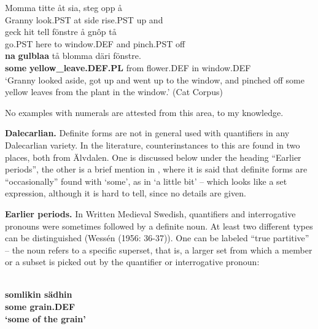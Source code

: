 \z

\ea
\gll Momma  titte  åt  sia,   steg  opp  å\\
Granny  look.PST  at  side  rise.PST  up  and\\
\gll geck  hit  tell  fönstre  å  gnôp  tå\\
go.PST  here  to  window.DEF  and  pinch.PST  off\\
\gll \textbf{na} \textbf{  gulblaa} tå  blomma  däri  fönstre.\\
\textbf{some} \textbf{yellow\_leave.DEF.PL} from  flower.DEF  in  window.DEF\\
\glt ‘Granny looked aside, got up and went up to the window, and pinched off some yellow leaves from the plant in the window.’ (Cat Corpus)

\z

No examples with numerals are attested from this area, to my knowledge.


\textbf{Dalecarlian. }Definite forms are not in general used with quantifiers in any Dalecarlian variety. In the literature, counterinstances to this are found in two places, both from Älvdalen. One is discussed below under the heading “Earlier periods”, the other is a brief mention in \citet[95]{Levander1909}, where it is said that definite forms are “occasionally” found with ‘some’, as in ‘a little bit’ – which looks like a set expression, although it is hard to tell, since no details are given.


\textbf{Earlier periods.} In Written Medieval Swedish, quantifiers and interrogative pronouns were sometimes followed by a definite noun. At least two different types can be distinguished (Wessén (1956: 36-37)). One can be labeled “true partitive” – the noun refers to a specific superset, that is, a larger set from which a member or a subset is picked out by the quantifier or interrogative pronoun:


\ea\label{}
\\
\gll\bfseries
somlikin  sädhin\\
\bfseries
some  grain.DEF\\
\glt ‘some of the grain’

